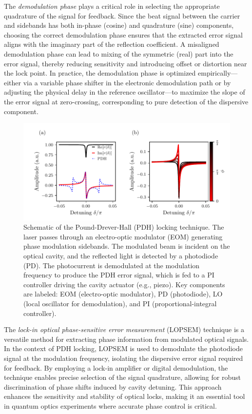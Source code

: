 \noindent The \textit{demodulation phase} plays a critical role in selecting the appropriate quadrature of the signal for feedback. Since the beat signal between the carrier and sidebands has both in-phase (cosine) and quadrature (sine) components, choosing the correct demodulation phase ensures that the extracted error signal aligns with the imaginary part of the reflection coefficient. A misaligned demodulation phase can lead to mixing of the symmetric (real) part into the error signal, thereby reducing sensitivity and introducing offset or distortion near the lock point. In practice, the demodulation phase is optimized empirically---either via a variable phase shifter in the electronic demodulation path or by adjusting the physical delay in the reference oscillator---to maximize the slope of the error signal at zero-crossing, corresponding to pure detection of the dispersive component.
\begin{figure}[htbp]
    \centering
    \includegraphics[width=\textwidth]{./chap3/fig/PDHplots.pdf}
    \caption{
        Schematic of the Pound-Drever-Hall (PDH) locking technique. 
        The laser passes through an electro-optic modulator (EOM) generating phase modulation sidebands. 
        The modulated beam is incident on the optical cavity, and the reflected light is detected by a photodiode (PD). 
        The photocurrent is demodulated at the modulation frequency to produce the PDH error signal, which is fed to a PI controller driving the cavity actuator (e.g., piezo). 
        Key components are labeled: EOM (electro-optic modulator), PD (photodiode), LO (local oscillator for demodulation), and PI (proportional-integral controller).
    }\label{fig:PDH_scheme}
\end{figure}

\noindent
The \textit{lock-in optical phase-sensitive error measurement} (LOPSEM) technique is a versatile method for extracting phase information from modulated optical signals. In the context of PDH locking, LOPSEM is used to demodulate the photodiode signal at the modulation frequency, isolating the dispersive error signal required for feedback. By employing a lock-in amplifier or digital demodulation, the technique enables precise selection of the signal quadrature, allowing for robust discrimination of phase shifts induced by cavity detuning. This approach enhances the sensitivity and stability of optical locks, making it an essential tool in quantum optics experiments where accurate phase control is critical.




